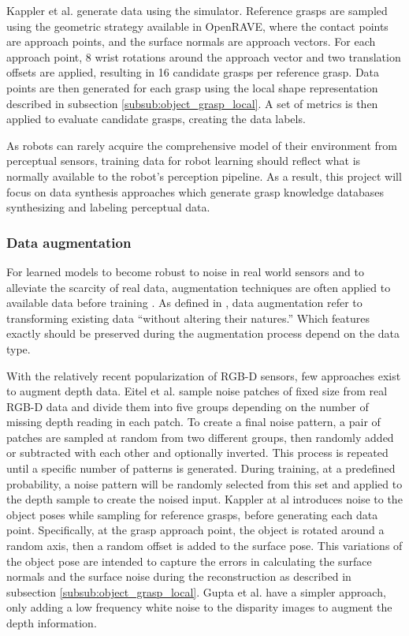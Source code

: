 Kappler et al. \cite{Kappler2015} generate data using the 
\cite{Diankov2010} simulator. Reference grasps are sampled using the geometric strategy available in OpenRAVE, where the
contact points are approach points, and the surface normals are approach vectors. For each approach point, 8 wrist
rotations around the approach vector and two translation offsets are applied, resulting in 16 candidate grasps per
reference grasp. Data points are then generated for each grasp using the local shape representation described in
subsection \ref{subsub:object_grasp_local}. A set of metrics is then applied to evaluate candidate grasps, creating the
data labels.

As robots can rarely acquire the comprehensive model of their environment from perceptual sensors, training data for
robot learning should reflect what is normally available to the robot's perception pipeline. As a result, this project
will focus on data synthesis approaches which generate grasp knowledge databases synthesizing and labeling perceptual
data.

\subsubsection{Data augmentation}

For learned models to become robust to noise in real world sensors and to alleviate the scarcity of real data,
augmentation techniques are often applied to available data before training
\cite{Eitel2015,Kappler2015,Gupta2014RGBDFeatures}. As defined in \cite{Gu2018}, data augmentation refer to transforming
existing data ``without altering their natures.'' Which features exactly should be preserved during the augmentation
process depend on the data type.

With the relatively recent popularization of RGB-D sensors, few approaches exist to augment depth data. Eitel et al.
\cite{Eitel2015} sample noise patches of fixed size from real RGB-D data and divide them into five groups depending on
the number of missing depth reading in each patch. To create a final noise pattern, a pair of patches are sampled at
random from two different groups, then randomly added or subtracted with each other and optionally inverted. This
process is repeated until a specific number of patterns is generated. During training, at a predefined probability,
a noise pattern will be randomly selected from this set and applied to the depth sample to create the noised input.
Kappler at al \cite{Kappler2015} introduces noise to the object poses while sampling for reference grasps, before
generating each data point. Specifically, at the grasp approach point, the object is rotated around a random axis, then
a random offset is added to the surface pose. This variations of the object pose are intended to capture the errors in
calculating the surface normals and the surface noise during the reconstruction as described in subsection
\ref{subsub:object_grasp_local}. Gupta et al. \cite{Gupta2014RGBDFeatures} have a simpler approach, only adding a low
frequency white noise to the disparity images to augment the depth information.

